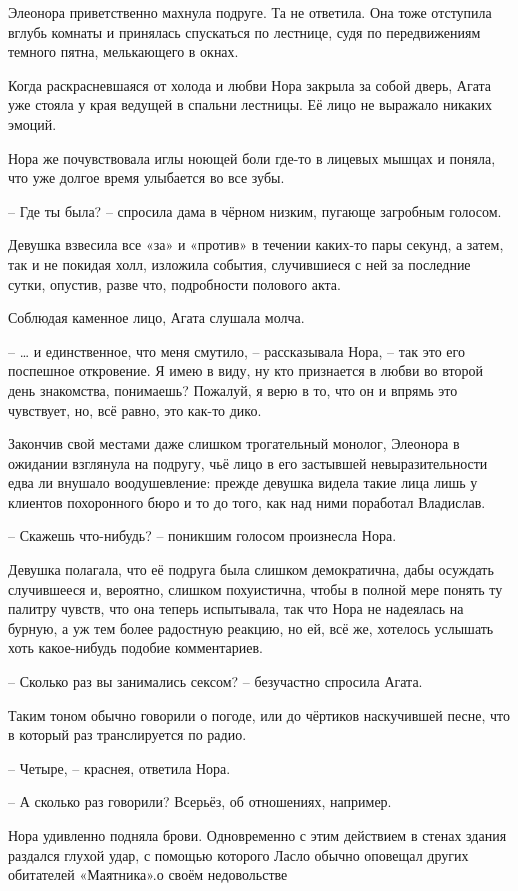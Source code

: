 \documentclass[
  a5paperpaper,
  DIV=11,
  numbers=noendperiod]{scrreprt}
\begin{document}
Элеонора приветственно махнула подруге. Та не ответила. Она тоже
отступила вглубь комнаты и принялась спускаться по лестнице, судя по
передвижениям темного пятна, мелькающего в окнах.

Когда раскрасневшаяся от холода и любви Нора закрыла за собой дверь,
Агата уже стояла у края ведущей в спальни лестницы. Её лицо не выражало
никаких эмоций.

Нора же почувствовала иглы ноющей боли где-то в лицевых мышцах и поняла,
что уже долгое время улыбается во все зубы.

-- Где ты была? -- спросила дама в чёрном низким, пугающе загробным
голосом.

Девушка взвесила все «за» и «против» в течении каких-то пары секунд, а
затем, так и не покидая холл, изложила события, случившиеся с ней за
последние сутки, опустив, разве что, подробности полового акта.

Соблюдая каменное лицо, Агата слушала молча.

-- \ldots{} и единственное, что меня смутило, -- рассказывала Нора, --
так это его поспешное откровение. Я имею в виду, ну кто признается в
любви во второй день знакомства, понимаешь? Пожалуй, я верю в то, что он
и впрямь это чувствует, но, всё равно, это как-то дико.

Закончив свой местами даже слишком трогательный монолог, Элеонора в
ожидании взглянула на подругу, чьё лицо в его застывшей
невыразительности едва ли внушало воодушевление: прежде девушка видела
такие лица лишь у клиентов похоронного бюро и то до того, как над ними
поработал Владислав.

-- Скажешь что-нибудь? -- поникшим голосом произнесла Нора.

Девушка полагала, что её подруга была слишком демократична, дабы
осуждать случившееся и, вероятно, слишком похуистична, чтобы в полной
мере понять ту палитру чувств, что она теперь испытывала, так что Нора
не надеялась на бурную, а уж тем более радостную реакцию, но ей, всё же,
хотелось услышать хоть какое-нибудь подобие комментариев.

-- Сколько раз вы занимались сексом? -- безучастно спросила Агата.

Таким тоном обычно говорили о погоде, или до чёртиков наскучившей песне,
что в который раз транслируется по радио.

-- Четыре, -- краснея, ответила Нора.

-- А сколько раз говорили? Всерьёз, об отношениях, например.

Нора удивленно подняла брови. Одновременно с этим действием в стенах
здания раздался глухой удар, с помощью которого Ласло обычно оповещал
других обитателей «Маятника».о своём недовольстве
\end{document}
